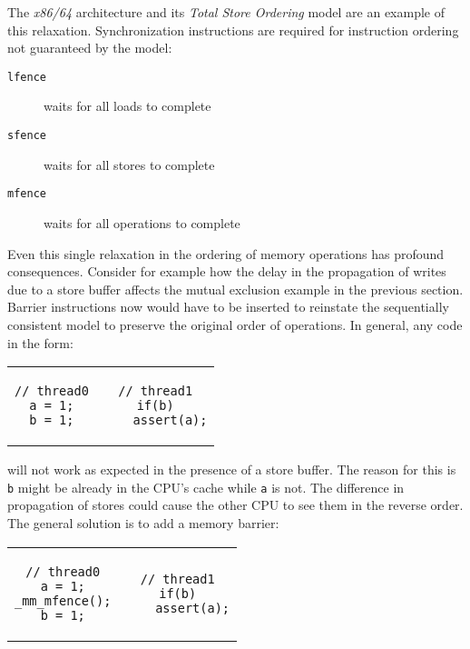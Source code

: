 The \textit{x86/64} architecture and its \textit{Total Store Ordering} model are
an example of this relaxation.  Synchronization instructions are required for
instruction ordering not guaranteed by the model:

\begin{description}
    \item[\texttt{lfence}] waits for all loads to complete
    \item[\texttt{sfence}] waits for all stores to complete
    \item[\texttt{mfence}] waits for all operations to complete
\end{description}

Even this single relaxation in the ordering of memory operations has profound
consequences.  Consider for example how the delay in the propagation of writes
due to a store buffer affects the mutual exclusion example in the previous
section.  Barrier instructions now would have to be inserted to reinstate the
sequentially consistent model to preserve the original order of operations.
In general, any code in the form:

\begin{center}
    \begin{tabular}{cc}
        \begin{lstlisting}[style=c]
// thread0
a = 1;
b = 1;
        \end{lstlisting}
        &
        \begin{lstlisting}[style=c]
// thread1
if(b)
    assert(a);
        \end{lstlisting}
    \end{tabular}
\end{center}

will not work as expected in the presence of a store buffer.  The reason for
this is \texttt{b} might be already in the CPU's cache while \texttt{a} is not.
The difference in propagation of stores could cause the other CPU to see them in
the reverse order.  The general solution is to add a memory barrier:

\begin{center}
    \begin{tabular}{cc}
        \begin{lstlisting}[style=c]
// thread0
a = 1;
_mm_mfence();
b = 1;
        \end{lstlisting}
        &
        \begin{lstlisting}[style=c,showlines=true]
// thread1
if(b)
    assert(a);

        \end{lstlisting}
    \end{tabular}
\end{center}

